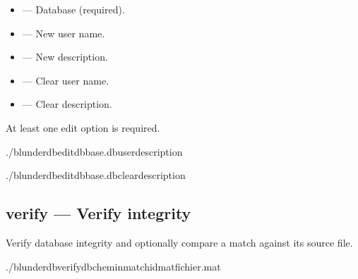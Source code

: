 \documentclass[letterpaper,10pt,english]{sphinxmanual}
\begin{document}
\sphinxAtStartPar
{}
\begin{itemize}
\item {} 
\sphinxAtStartPar
{} — Database (required).

\item {} 
\sphinxAtStartPar
{} — New user name.

\item {} 
\sphinxAtStartPar
{} — New description.

\item {} 
\sphinxAtStartPar
{} — Clear user name.

\item {} 
\sphinxAtStartPar
{} — Clear description.

\end{itemize}

\sphinxAtStartPar
At least one edit option is required.

\sphinxAtStartPar
{}

\begin{sphinxVerbatim}[commandchars=\\\{\}]
./blunderdbedit\PYGZhy{}\PYGZhy{}dbbase.db\PYGZhy{}\PYGZhy{}user\PYGZhy{}\PYGZhy{}description

./blunderdbedit\PYGZhy{}\PYGZhy{}dbbase.db\PYGZhy{}\PYGZhy{}clear\PYGZhy{}description
\end{sphinxVerbatim}


\subsection{verify — Verify integrity}
\label{\detokenize{cli:verify-verifier-l-integrite}}
\sphinxAtStartPar
Verify database integrity and optionally compare a match against its source file.

\begin{sphinxVerbatim}[commandchars=\\\{\}]
./blunderdbverify\PYGZhy{}\PYGZhy{}db\PYGZlt{}chemin\PYGZgt{}\PYG{o}{[}\PYGZhy{}\PYGZhy{}match\PYGZlt{}id\PYGZgt{}\PYG{o}{]}\PYG{o}{[}\PYGZhy{}\PYGZhy{}mat\PYGZlt{}fichier.mat\PYGZgt{}\PYG{o}{]}
\end{sphinxVerbatim}
\end{document}
